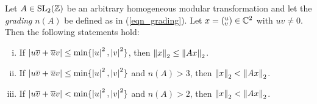 \begin{theorem}
\label{thm_SL2FunDomGlobMin}
Let $A \in \operatorname{SL}_{2}(\mathbb{Z})$ be an arbitrary homogeneous modular transformation and let the \emph{grading} $n(A)$ be defined as in (\ref{eqn_grading}). Let $x = ({}^u_v) \in \mathbb{C}^2$ with $uv \ne 0$. Then the following statements hold:
\begin{enumerate}[(i)]
\item \label{itm_SL2FunDomGlobMinA}
If $\left|u\overline{v} + \overline{u}v\right| \le \min\{\left|u\right|^2,\left|v\right|^2\}$, then $\left\| x \right\|_2 \le \left\| Ax \right\|_2$.
\item \label{itm_SL2FunDomGlobMinB}
If $\left|u\overline{v} + \overline{u}v\right| \le \min\{\left|u\right|^2,\left|v\right|^2\}$ and $n(A) > 3$, then $\left\| x \right\|_2 < \left\| Ax \right\|_2$.
\item \label{itm_SL2FunDomGlobMinC}
If $\left|u\overline{v} + \overline{u}v\right| < \min\{\left|u\right|^2,\left|v\right|^2\}$ and $n(A) > 2$, 
then $\left\| x \right\|_2 < \left\| Ax \right\|_2$.
\end{enumerate}
\end{theorem}
